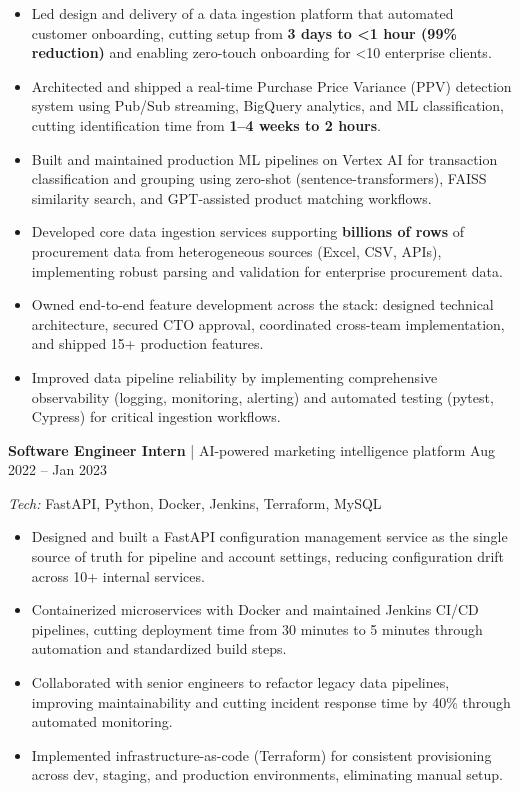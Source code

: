 \documentclass[11pt]{article}
\begin{document}
\vspace{-8pt}

\begin{itemize}
    \item Led design and delivery of a data ingestion platform that automated customer onboarding, cutting setup from \textbf{3 days to <1 hour (99\% reduction)} and enabling zero-touch onboarding for <10 enterprise clients.
    \item Architected and shipped a real-time Purchase Price Variance (PPV) detection system using Pub/Sub streaming, BigQuery analytics, and ML classification, cutting identification time from \textbf{1--4 weeks to 2 hours}.
    \item Built and maintained production ML pipelines on Vertex AI for transaction classification and grouping using zero-shot (sentence-transformers), FAISS similarity search, and GPT-assisted product matching workflows.
    \item Developed core data ingestion services supporting \textbf{billions of rows} of procurement data from heterogeneous sources (Excel, CSV, APIs), implementing robust parsing and validation for enterprise procurement data.
    \item Owned end-to-end feature development across the stack: designed technical architecture, secured CTO approval, coordinated cross-team implementation, and shipped 15+ production features.
    \item Improved data pipeline reliability by implementing comprehensive observability (logging, monitoring, alerting) and automated testing (pytest, Cypress) for critical ingestion workflows.
\end{itemize}

\textbf{Software Engineer Intern} | AI-powered marketing intelligence platform
\hfill
Aug 2022 -- Jan 2023

\textit{Tech:} FastAPI, Python, Docker, Jenkins, Terraform, MySQL

\vspace{-8pt}

\begin{itemize}
    \item Designed and built a FastAPI configuration management service as the single source of truth for pipeline and account settings, reducing configuration drift across 10+ internal services.
    \item Containerized microservices with Docker and maintained Jenkins CI/CD pipelines, cutting deployment time from 30 minutes to 5 minutes through automation and standardized build steps.
    \item Collaborated with senior engineers to refactor legacy data pipelines, improving maintainability and cutting incident response time by 40\% through automated monitoring.
    \item Implemented infrastructure-as-code (Terraform) for consistent provisioning across dev, staging, and production environments, eliminating manual setup.
\end{itemize}
\end{document}
